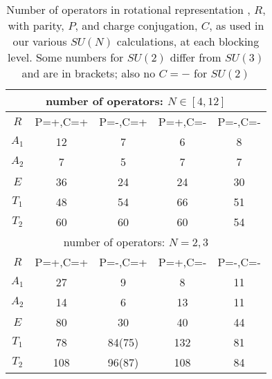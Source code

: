 \documentclass[12pt]{article}
\begin{document}
\begin{table}[htb]
\centering
\begin{tabular}{|c|c|c|c|c|} \hline
\multicolumn{5}{|c|}{number of operators: $N\in [4,12]$} \\ \hline
  $R$   & P=+,C=+ & P=-,C=+ &  P=+,C=-   &  P=-,C=-   \\ \hline
$A_1$  & 12 & 7   & 6   & 8 \\
$A_2$  &  7 & 5   & 7   & 7 \\ 
$E$    & 36 & 24  & 24  & 30 \\
$T_1$  & 48 & 54  & 66  & 51 \\
$T_2$  & 60 & 60  & 60  & 54 \\ \hline
\multicolumn{5}{|c|}{number of operators: $N=2,3$} \\ \hline
  $R$   & P=+,C=+ & P=-,C=+ &  P=+,C=-   &  P=-,C=-   \\ \hline
$A_1$  & 27  & 9  & 8   & 11 \\ 
$A_2$  & 14  & 6  & 13  & 11 \\ 
$E$    & 80  & 30 & 40  & 44 \\ 
$T_1$  & 78  & 84(75) & 132 & 81 \\ 
$T_2$  & 108 & 96(87) & 108 & 84 \\ \hline
\end{tabular}
\caption{Number of operators in rotational representation , $R$, with parity, $P$, and charge conjugation, $C$,
  as used in our various $SU(N)$ calculations, at each blocking level. Some numbers for $SU(2)$
  differ from $SU(3)$ and are in brackets; also no $C=-$ for $SU(2)$} 
\label{table_numops_N}
\end{table}
\end{document}
